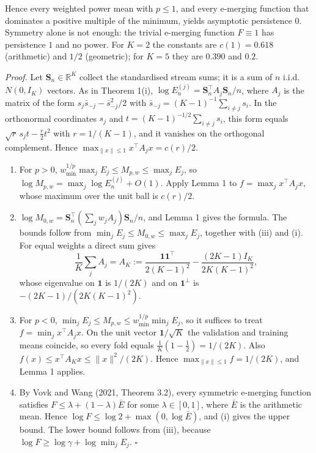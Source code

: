 \documentclass[
  10pt,
  a4paper,
]{article}
\begin{document}
Hence every weighted power mean with \(p\le1\), and every e-merging
function that dominates a positive multiple of the minimum, yields
asymptotic persistence \(0\). Symmetry alone is not enough: the trivial
e-merging function \(F\equiv1\) has persistence \(1\) and no power. For
\(K=2\) the constants are \(c(1)=0.618\) (arithmetic) and \(1/2\)
(geometric); for \(K=5\) they are \(0.390\) and \(0.2\).

\emph{Proof.} Let \(\mathbf S_n\in\mathbb R^K\) collect the standardised
stream sums; it is a sum of \(n\) i.i.d. \(N(0,I_K)\) vectors. As in
Theorem 1(i), \(\log E^{(j)}_n=\mathbf S_n^\top A_j\mathbf S_n/n\),
where \(A_j\) is the matrix of the form
\(s_j\bar s_{-j}-\bar s_{-j}^2/2\) with
\(\bar s_{-j}=(K-1)^{-1}\sum_{i\ne j}s_i\). In the orthonormal
coordinates \(s_j\) and \(t=(K-1)^{-1/2}\sum_{i\ne j}s_i\), this form
equals \(\sqrt r\,s_jt-\tfrac r2t^2\) with \(r=1/(K-1)\), and it
vanishes on the orthogonal complement. Hence
\(\max_{\|x\|\le1}x^\top A_jx=c(r)/2\).

\begin{enumerate}
\def\labelenumi{(\roman{enumi})}
\item
  For \(p>0\), \(w_{\min}^{1/p}\max_jE_j\le M_{p,w}\le\max_jE_j\), so
  \(\log M_{p,w}=\max_j\log E^{(j)}_n+O(1)\). Apply Lemma 1 to
  \(f=\max_jx^\top A_jx\), whose maximum over the unit ball is
  \(c(r)/2\).
\item
  \(\log M_{0,w}=\mathbf S_n^\top(\sum_jw_jA_j)\mathbf S_n/n\), and
  Lemma 1 gives the formula. The bounds follow from
  \(\min_jE_j\le M_{0,w}\le\max_jE_j\), together with (iii) and (i). For
  equal weights a direct sum gives
  \[\frac1K\sum_jA_j=A_K:=\frac{\mathbf 1\mathbf 1^\top}{2(K-1)^2}-\frac{(2K-1)I_K}{2K(K-1)^2},\]
  whose eigenvalue on \(\mathbf 1\) is \(1/(2K)\) and on
  \(\mathbf 1^\perp\) is \(-(2K-1)/(2K(K-1)^2)\).
\item
  For \(p<0\), \(\min_jE_j\le M_{p,w}\le w_{\min}^{1/p}\min_jE_j\), so
  it suffices to treat \(f=\min_jx^\top A_jx\). On the unit vector
  \(\mathbf 1/\sqrt K\) the validation and training means coincide, so
  every fold equals \(\tfrac1K(1-\tfrac12)=1/(2K)\). Also
  \(f(x)\le x^\top A_Kx\le\|x\|^2/(2K)\). Hence
  \(\max_{\|x\|\le1}f=1/(2K)\), and Lemma 1 applies.
\item
  By Vovk and Wang (2021, Theorem 3.2), every symmetric e-merging
  function satisfies \(F\le\lambda+(1-\lambda)\bar E\) for some
  \(\lambda\in[0,1]\), where \(\bar E\) is the arithmetic mean. Hence
  \(\log F\le\log2+\max(0,\log\bar E)\), and (i) gives the upper bound.
  The lower bound follows from (iii), because
  \(\log F\ge\log\gamma+\log\min_jE_j\). \(\square\)
\end{enumerate}
\end{document}
